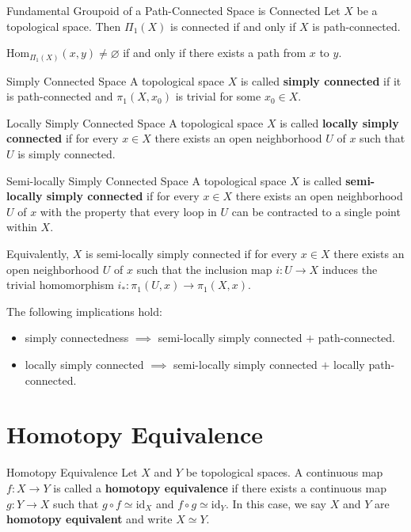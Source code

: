 \documentclass{report}
\newcommand{\Hom}{\mathrm{Hom}}
\begin{document}
\begin{proposition}{Fundamental Groupoid of a Path-Connected Space is Connected}{}
	Let $X$ be a topological space. Then $\Pi_1(X)$ is connected if and only if $X$ is path-connected.
\end{proposition}

\begin{prf}
	$\Hom_{\Pi_1(X)}(x,y)\ne \varnothing$ if and only if there exists a path from $x$ to $y$.
\end{prf}

\begin{definition}{Simply Connected Space}{}
	A topological space $X$ is called \textbf{simply connected} if it is path-connected and $\pi_1(X,x_0)$ is trivial for some $x_0\in X$.
\end{definition}

\begin{definition}{Locally Simply Connected Space}{}
	A topological space $X$ is called \textbf{locally simply connected} if for every $x\in X$ there exists an open 
	neighborhood $U$ of $x$ such that $U$ is simply connected.
\end{definition}

\begin{definition}{Semi-locally Simply Connected Space}{}
	A topological space $X$ is called \textbf{semi-locally simply connected} if for every $x\in X$ there exists an open neighborhood $U$ of $x$ with the property that every loop in $U$ can be contracted to a single point within $X$.

	Equivalently, $X$ is semi-locally simply connected if for every $x\in X$ there exists an open neighborhood $U$ of $x$ such that the inclusion map $i:U\to X$ induces the trivial homomorphism $i_*:\pi_1(U,x)\to \pi_1(X,x)$.
	
\end{definition}

\begin{proposition}{}{}
	The following implications hold:
	\begin{itemize}
		\item simply connectedness $\implies$ semi-locally simply connected $+$ path-connected.
		\item locally simply connected $\implies$ semi-locally simply connected $+$ locally path-connected.
	\end{itemize}
\end{proposition}

\section{Homotopy Equivalence}
\begin{definition}{Homotopy Equivalence}{}
	Let $X$ and $Y$ be topological spaces. A continuous map $f:X\to Y$ is called a \textbf{homotopy equivalence} if there exists a continuous map $g:Y\to X$ such that $g\circ f\simeq \mathrm{id}_X$ and $f\circ g\simeq \mathrm{id}_Y$. In this case, we say $X$ and $Y$ are \textbf{homotopy equivalent} and write $X\simeq Y$.
\end{definition}
\end{document}
